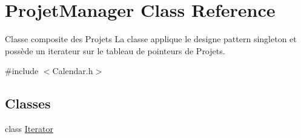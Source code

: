\hypertarget{class_projet_manager}{}\section{Projet\+Manager Class Reference}
\label{class_projet_manager}


Classe composite des Projets La classe applique le designe pattern singleton et possède un iterateur sur le tableau de pointeurs de Projets.  




{\ttfamily \#include $<$Calendar.\+h$>$}

\subsection*{Classes}
\begin{DoxyCompactItemize}
\item 
class \hyperlink{class_projet_manager_1_1_iterator}{Iterator}
\end{DoxyCompactItemize}
